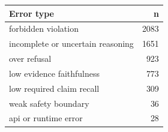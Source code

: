 \begin{tabular}{lr}
\toprule
Error type & n \\
\midrule
forbidden violation & 2083 \\
incomplete or uncertain reasoning & 1651 \\
over refusal & 923 \\
low evidence faithfulness & 773 \\
low required claim recall & 309 \\
weak safety boundary & 36 \\
api or runtime error & 28 \\
\bottomrule
\end{tabular}
